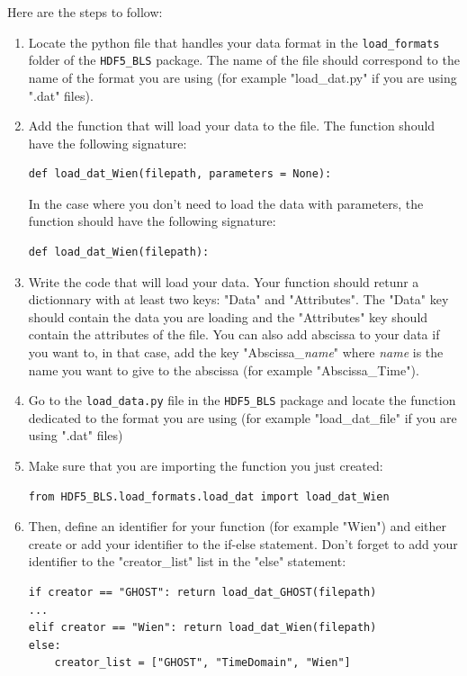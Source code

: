 \documentclass{book}
\begin{document}
            Here are the steps to follow:
            \begin{enumerate}
                \item Locate the python file that handles your data format in the \texttt{load\_formats} folder of the \texttt{HDF5\_BLS} package. The name of the file should correspond to the name of the format you are using (for example "load\_dat.py" if you are using ".dat" files).
                \item Add the function that will load your data to the file. The function should have the following signature:
\begin{lstlisting}
def load_dat_Wien(filepath, parameters = None):
\end{lstlisting}
                In the case where you don't need to load the data with parameters, the function should have the following signature:
\begin{lstlisting}
def load_dat_Wien(filepath):
\end{lstlisting}
                \item Write the code that will load your data. Your function should retunr a dictionnary with at least two keys: "Data" and "Attributes". The "Data" key should contain the data you are loading and the "Attributes" key should contain the attributes of the file. You can also add abscissa to your data if you want to, in that case, add the key "Abscissa\_\textsl{name}" where \textsl{name} is the name you want to give to the abscissa (for example "Abscissa\_Time").
                \item Go to the \texttt{load\_data.py} file in the \texttt{HDF5\_BLS} package and locate the function dedicated to the format you are using (for example "load\_dat\_file" if you are using ".dat" files)
                \item Make sure that you are importing the function you just created:
\begin{lstlisting}
from HDF5_BLS.load_formats.load_dat import load_dat_Wien
\end{lstlisting}
                \item Then, define an identifier for your function (for example "Wien") and either create or add your identifier to the if-else statement. Don't forget to add your identifier to the "creator\_list" list in the "else" statement:
\begin{lstlisting}
if creator == "GHOST": return load_dat_GHOST(filepath)
...
elif creator == "Wien": return load_dat_Wien(filepath)
else:
    creator_list = ["GHOST", "TimeDomain", "Wien"]

\end{lstlisting}
\end{enumerate}
\end{document}
